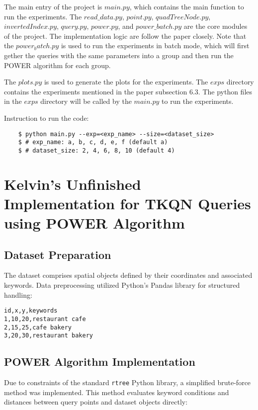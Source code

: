 \documentclass[]{IEEEphot}
\begin{document}
The main entry of the project is $main.py$, which contains the main function to run the experiments. The $read\_data.py$, $point.py$, $quadTreeNode.py$, $invertedIndex.py$, $query.py$, $power.py$, and $power\_batch.py$ are the core modules of the project. The implementation logic are follow the paper closely. Note that the $power_batch.py$ is used to run the experiments in batch mode, which will first gether the queries with the same parameters into a group and then run the POWER algorithm for each group.

The $plots.py$ is used to generate the plots for the experiments. The $exps$ directory contains the experiments mentioned in the paper subsection 6.3. The python files in the $exps$ directory will be called by the $main.py$ to run the experiments.

Instruction to run the code:

\begin{lstlisting}
    $ python main.py --exp=<exp_name> --size=<dataset_size>
    $ # exp_name: a, b, c, d, e, f (default a)
    $ # dataset_size: 2, 4, 6, 8, 10 (default 4)
\end{lstlisting}

\section{Kelvin's Unfinished Implementation for TKQN Queries using POWER Algorithm}

\subsection{Dataset Preparation}
The dataset comprises spatial objects defined by their coordinates  and associated keywords. Data preprocessing utilized Python's Pandas library for structured handling:

\begin{verbatim}
id,x,y,keywords
1,10,20,restaurant cafe
2,15,25,cafe bakery
3,20,30,restaurant bakery
\end{verbatim}

\subsection{POWER Algorithm Implementation}
Due to constraints of the standard \texttt{rtree} Python library, a simplified brute-force method was implemented. This method evaluates keyword conditions and distances between query points and dataset objects directly:
\end{document}
